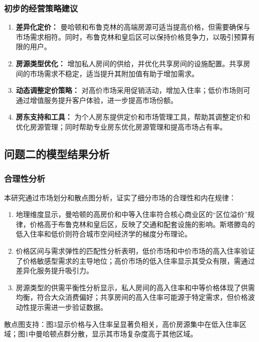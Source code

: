 \documentclass[12pt]{article}
\begin{document}
\begin{CJK}{UTF8}{gbsn}
	\subsubsection{初步的经营策略建议}
	\begin{enumerate}
		\item \textbf{差异化定价：} 曼哈顿和布鲁克林的高端房源可适当提高价格，但需要确保与市场需求相符。同时，布鲁克林和皇后区可以保持价格竞争力，以吸引预算有限的用户。
		\item \textbf{房源类型优化：} 增加私人房间的供给，并优化共享房间的设施配置。共享房间的市场需求不稳定，适当提升其附加值有助于增加需求。
		\item \textbf{动态调整定价策略：} 对高价市场采用促销活动，增加入住率；低价市场则可通过增值服务提升客户体验，进一步提高市场份额。
		\item \textbf{房东支持和工具：} 为个人房东提供定价和市场管理工具，帮助其调整定价和优化房源管理；同时帮助专业房东优化房源管理和提高市场占有率。
	\end{enumerate}
	
	\subsection{问题二的模型结果分析}
	
	\subsubsection{合理性分析}
	本研究通过市场划分和散点图分析，证实了细分市场的合理性和内在规律：
	\begin{enumerate}
		\item 地理维度显示，曼哈顿的高房价和中等入住率符合核心商业区的“区位溢价”规律，价格高于布鲁克林和皇后区，反映了交通和配套设施的影响。斯塔滕岛的低入住率和低价则符合城市空间经济学的梯度分布理论。
		\item 价格区间与需求弹性的匹配性分析表明，低价市场和中价市场的高入住率验证了价格敏感型需求的主导地位；高价市场的低入住率显示其受众有限，需通过差异化服务提升吸引力。
		\item 房源类型的供需平衡性分析显示，私人房间的高入住率和中等价格体现了供需均衡，符合大众消费偏好；共享房间的高入住率可能源于特定需求，但价格波动性提示需进一步验证数据。
	\end{enumerate}
	
	散点图支持：图3显示价格与入住率呈显著负相关，高价房源集中在低入住率区域；图1中曼哈顿点群分散，显示其市场复杂度高于其他区域。
	

\end{CJK}
\end{document}
